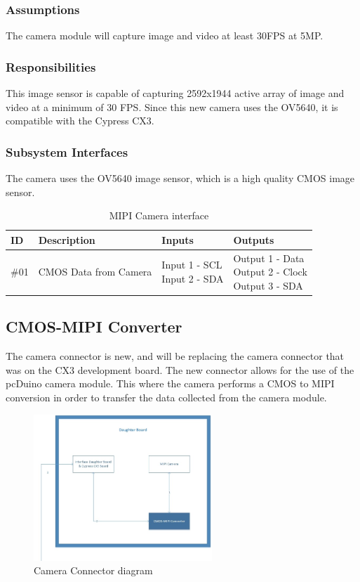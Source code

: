 \subsubsection{Assumptions}
The camera module will capture image and video at least 30FPS at 5MP.

\subsubsection{Responsibilities}
This image sensor is capable of capturing 2592x1944 active array of image and video at a minimum of 30 FPS. Since this new camera uses the OV5640, it is compatible with the Cypress CX3.

\subsubsection{Subsystem Interfaces}

The camera uses the OV5640 image sensor, which is a high quality CMOS image sensor.

\begin {table}[H]
\caption {MIPI Camera interface}
\begin{center}
    \begin{tabular}{ | p{1cm} | p{6cm} | p{3cm} | p{3cm} |}
    \hline
    ID & Description & Inputs & Outputs \\ \hline
    \#01 & CMOS Data from Camera & \pbox{3cm}{Input 1 - SCL \\ Input 2 - SDA} & \pbox{3cm}{Output 1 - Data \\ Output 2 - Clock \\ Output 3 - SDA}  \\ \hline
    \end{tabular}
\end{center}
\end{table}

\subsection{CMOS-MIPI Converter}
The camera connector is new, and will be replacing the camera connector that was on the CX3 development board. The new connector allows for the use of the pcDuino camera module. This where the camera performs a CMOS to MIPI conversion in order to transfer the data collected from the camera module.

\begin{figure}[h!]
	\centering
 	\includegraphics[width=0.60\textwidth]{images/DaughterBoard_converter}
 \caption{Camera Connector diagram}
\end{figure}

